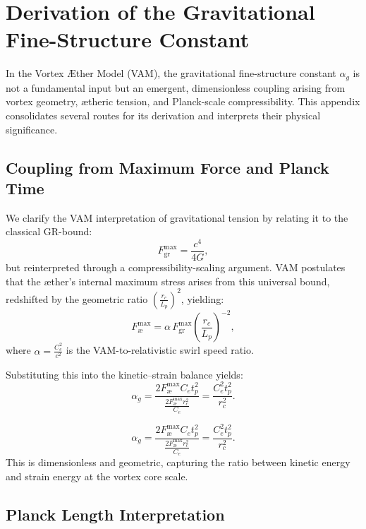 \section{Derivation of the Gravitational Fine-Structure Constant}
\label{appendix:alpha_g}

In the Vortex Æther Model (VAM), the gravitational fine-structure constant $\alpha_g$ is not a fundamental input but an emergent, dimensionless coupling arising from vortex geometry, ætheric tension, and Planck-scale compressibility. This appendix consolidates several routes for its derivation and interprets their physical significance.

\subsection*{Coupling from Maximum Force and Planck Time}

We clarify the VAM interpretation of gravitational tension by relating it to the classical GR-bound:
\begin{equation}
    F^{\text{max}}_{\text{gr}} = \frac{c^4}{4G},
\end{equation}
but reinterpreted through a compressibility-scaling argument. VAM postulates that the æther's internal maximum stress arises from this universal bound, redshifted by the geometric ratio \( \left(\frac{r_c}{L_p}\right)^2 \), yielding:
\begin{equation}
    F^{\text{max}}_{\text{\ae}} = \alpha \, F^{\text{max}}_{\text{gr}} \left(\frac{r_c}{L_p}\right)^{-2}, \label{eq:FmaxVAM}
\end{equation}
where \( \alpha = \frac{C_e^2}{c^2} \) is the VAM-to-relativistic swirl speed ratio.

Substituting this into the kinetic–strain balance yields:
\begin{equation}
    \alpha_g = \frac{2 F^{\text{max}}_{\text{\ae}} C_e t_p^2}{\frac{2 F^{\text{max}}_{\text{\ae}} r_c^2}{C_e}} = \frac{C_e^2 t_p^2}{r_c^2}.
\end{equation}

\[
    \alpha_g = \frac{2 F^{\text{max}}_{\text{\ae}} C_e t_p^2}{\frac{2 F^{\text{max}}_{\text{\ae}} r_c^2}{C_e}} = \frac{C_e^2 t_p^2}{r_c^2}.
\]
This is dimensionless and geometric, capturing the ratio between kinetic energy and strain energy at the vortex core scale.

\subsection*{Planck Length Interpretation}

